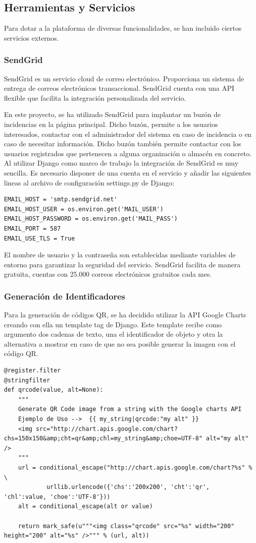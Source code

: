 \documentclass[a4paper,11pt]{book}
\begin{document}
\subsection{Herramientas y Servicios}
Para dotar a la plataforma de diversas funcionalidades, se han incluido ciertos servicios externos. 

\subsubsection{SendGrid}
SendGrid\cite{sg} es un servicio cloud de correo electrónico. Proporciona un sistema de entrega de correos electrónicos transaccional. SendGrid cuenta con una API flexible que facilita la integración personalizada del servicio. 
 

En este proyecto, se ha utilizado SendGrid para implantar un buzón de incidencias en la página principal. Dicho buzón, permite a los usuarios interesados, contactar con el administrador del sistema en caso de incidencia o en caso de necesitar información. Dicho buzón también permite contactar con los usuarios registrados que pertenecen a alguna organización o almacén en concreto. Al utilizar Django como marco de trabajo la integración de  SendGrid  es muy sencilla. Es necesario disponer de una cuenta en el servicio y añadir las siguientes lineas al archivo de configuración settings.py de Django:
\begin{lstlisting}
EMAIL_HOST = 'smtp.sendgrid.net'
EMAIL_HOST_USER = os.environ.get('MAIL_USER')
EMAIL_HOST_PASSWORD = os.environ.get('MAIL_PASS')
EMAIL_PORT = 587
EMAIL_USE_TLS = True
\end{lstlisting}
El nombre de usuario y la contraseña son establecidas mediante variables de entorno para garantizar la seguridad del servicio. SendGrid facilita de manera gratuita, cuentas con 25.000 correos electrónicos gratuitos cada mes.

\subsubsection{Generación de Identificadores }

Para la generación de códigos QR, se ha decidido utilizar la API  Google Charts\cite{googleqr} creando con ella un template tag de Django. Este template recibe como argumento dos cadenas de texto, una el identificador de objeto y otra la alternativa a mostrar en caso de que no sea posible generar la imagen con el código QR. 

\begin{lstlisting}
@register.filter
@stringfilter
def qrcode(value, alt=None):
    """
    Generate QR Code image from a string with the Google charts API
    Ejemplo de Uso -->  {{ my_string|qrcode:"my alt" }}
    <img src="http://chart.apis.google.com/chart?chs=150x150&amp;cht=qr&amp;chl=my_string&amp;choe=UTF-8" alt="my alt" />
    """
    url = conditional_escape("http://chart.apis.google.com/chart?%s" % \
            urllib.urlencode({'chs':'200x200', 'cht':'qr', 'chl':value, 'choe':'UTF-8'}))
    alt = conditional_escape(alt or value)

    return mark_safe(u"""<img class="qrcode" src="%s" width="200" height="200" alt="%s" />""" % (url, alt))
\end{lstlisting}
\end{document}

